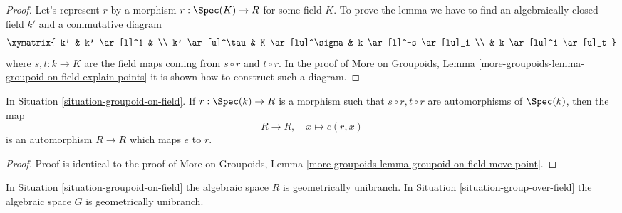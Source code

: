 \begin{proof}
Let's represent $r$ by a morphism $r : \Spec(K) \to R$ for some
field $K$. To prove the lemma we have to find an algebraically closed
field $k'$ and a commutative diagram
$$
\xymatrix{
k' & k' \ar[l]^1 & \\
k' \ar[u]^\tau & K \ar[lu]^\sigma & k \ar[l]^-s \ar[lu]_i \\
& k \ar[lu]^i \ar[u]_t
}
$$
where $s, t : k \to K$ are the field maps coming from
$s \circ r$ and $t \circ r$. In the proof of
More on Groupoids,
Lemma \ref{more-groupoids-lemma-groupoid-on-field-explain-points}
it is shown how to construct such a diagram.
\end{proof}

\begin{lemma}
\label{lemma-groupoid-on-field-move-point}
In
Situation \ref{situation-groupoid-on-field}.
If $r : \Spec(k) \to R$ is a morphism such that
$s \circ r, t \circ r$ are automorphisms of $\Spec(k)$, then the map
$$
R \longrightarrow R, \quad
x \longmapsto c(r, x)
$$
is an automorphism $R \to R$ which maps $e$ to $r$.
\end{lemma}

\begin{proof}
Proof is identical to the proof of
More on Groupoids,
Lemma \ref{more-groupoids-lemma-groupoid-on-field-move-point}.
\end{proof}

\begin{lemma}
\label{lemma-groupoid-on-field-geometrically-irreducible}
In
Situation \ref{situation-groupoid-on-field}
the algebraic space $R$ is geometrically unibranch. In
Situation \ref{situation-group-over-field}
the algebraic space $G$ is geometrically unibranch.
\end{lemma}


